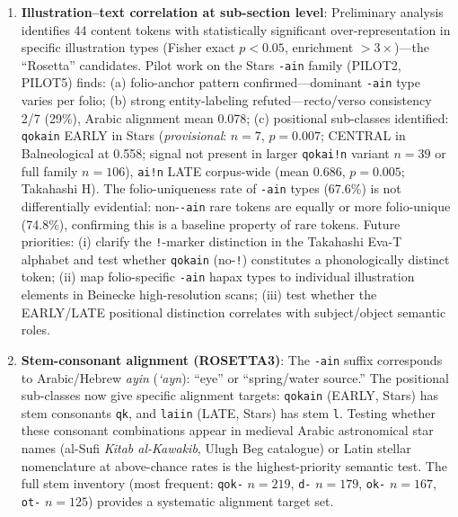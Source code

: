 \documentclass[11pt,a4paper,twocolumn]{article}
\begin{document}
\begin{enumerate}[leftmargin=*,itemsep=2pt]
    \item \textbf{Illustration--text correlation at sub-section level}: Preliminary analysis identifies 44 content tokens with statistically significant over-representation in specific illustration types (Fisher exact $p < 0.05$, enrichment $> 3\times$)---the ``Rosetta'' candidates. Pilot work on the Stars \texttt{-ain} family (PILOT2, PILOT5) finds: (a) folio-anchor pattern confirmed---dominant \texttt{-ain} type varies per folio; (b) strong entity-labeling refuted---recto/verso consistency 2/7 (29\%), Arabic alignment mean 0.078; (c) positional sub-classes identified: \texttt{qokain} EARLY in Stars (\textit{provisional}: $n = 7$, $p = 0.007$; CENTRAL in Balneological at 0.558; signal not present in larger \texttt{qokai!n} variant $n=39$ or full family $n=106$), \texttt{ai!n} LATE corpus-wide (mean 0.686, $p = 0.005$; Takahashi H). The folio-uniqueness rate of \texttt{-ain} types (67.6\%) is not differentially evidential: non-\texttt{-ain} rare tokens are equally or more folio-unique (74.8\%), confirming this is a baseline property of rare tokens. Future priorities: (i) clarify the \texttt{!}-marker distinction in the Takahashi Eva-T alphabet and test whether \texttt{qokain} (no-\texttt{!}) constitutes a phonologically distinct token; (ii) map folio-specific \texttt{-ain} hapax types to individual illustration elements in Beinecke high-resolution scans; (iii) test whether the EARLY/LATE positional distinction correlates with subject/object semantic roles.

    \item \textbf{Stem-consonant alignment (ROSETTA3)}: The \texttt{-ain} suffix corresponds to Arabic/Hebrew \textit{ayin} (\textit{{`}ayn}): ``eye'' or ``spring/water source.'' The positional sub-classes now give specific alignment targets: \texttt{qokain} (EARLY, Stars) has stem consonants \texttt{qk}, and \texttt{laiin} (LATE, Stars) has stem \texttt{l}. Testing whether these consonant combinations appear in medieval Arabic astronomical star names (al-Sufi \textit{Kitab al-Kawakib}, Ulugh Beg catalogue) or Latin stellar nomenclature at above-chance rates is the highest-priority semantic test. The full stem inventory (most frequent: \texttt{qok-} $n=219$, \texttt{d-} $n=179$, \texttt{ok-} $n=167$, \texttt{ot-} $n=125$) provides a systematic alignment target set.


\end{enumerate}
\end{document}
